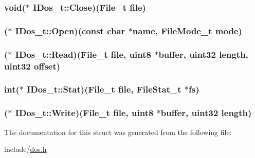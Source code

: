 \hypertarget{structIDos__t_a5a60d031db8a3720299ec5c886d941f3}{
\subsubsection[{Close}]{\setlength{\rightskip}{0pt plus 5cm}void($\ast$ I\+Dos\+\_\+t\+::\+Close)({\bf File\+\_\+t} file)}}\label{structIDos__t_a5a60d031db8a3720299ec5c886d941f3}
\hypertarget{structIDos__t_a3c8c9ae4c3789276390aa10a30f7ea8a}{
\subsubsection[{Open}]{($\ast$ I\+Dos\+\_\+t\+::\+Open)(const char $\ast$name, {\bf File\+Mode\+\_\+t} mode)}}\label{structIDos__t_a3c8c9ae4c3789276390aa10a30f7ea8a}
\hypertarget{structIDos__t_afde908870eb926935b5288a04307626c}{
\subsubsection[{Read}]{($\ast$ I\+Dos\+\_\+t\+::\+Read)({\bf File\+\_\+t} file, {\bf uint8} $\ast$buffer, {\bf uint32} length, {\bf uint32} offset)}}\label{structIDos__t_afde908870eb926935b5288a04307626c}
\hypertarget{structIDos__t_aab38b44d7df90ff913d28d34ad663073}{
\subsubsection[{Stat}]{\setlength{\rightskip}{0pt plus 5cm}int($\ast$ I\+Dos\+\_\+t\+::\+Stat)({\bf File\+\_\+t} file, {\bf File\+Stat\+\_\+t} $\ast$fs)}}\label{structIDos__t_aab38b44d7df90ff913d28d34ad663073}
\hypertarget{structIDos__t_ac6fcad20ab581ddb3abbca96f681d8fe}{
\subsubsection[{Write}]{($\ast$ I\+Dos\+\_\+t\+::\+Write)({\bf File\+\_\+t} file, {\bf uint8} $\ast$buffer, {\bf uint32} length)}}\label{structIDos__t_ac6fcad20ab581ddb3abbca96f681d8fe}


The documentation for this struct was generated from the following file\+:\begin{DoxyCompactItemize}
\item 
include/\hyperlink{dos_8h}{dos.\+h}\end{DoxyCompactItemize}
